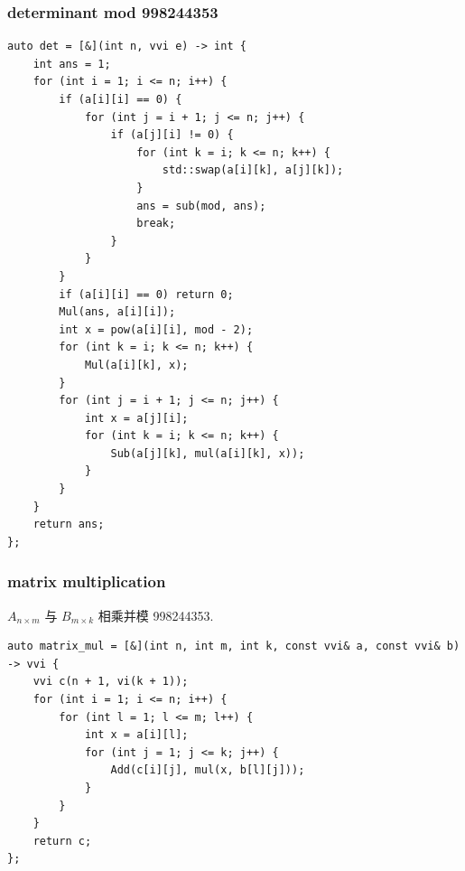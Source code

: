 \documentclass[UTF8, a4paper, titlepage, twoside]{ctexart}
\begin{document}
\subsubsection*{ determinant mod 998244353}
\begin{lstlisting}[style=cpp]
auto det = [&](int n, vvi e) -> int {
    int ans = 1;
    for (int i = 1; i <= n; i++) {
        if (a[i][i] == 0) {
            for (int j = i + 1; j <= n; j++) {
                if (a[j][i] != 0) {
                    for (int k = i; k <= n; k++) {
                        std::swap(a[i][k], a[j][k]);
                    }
                    ans = sub(mod, ans);
                    break;
                }
            }
        }
        if (a[i][i] == 0) return 0;
        Mul(ans, a[i][i]);
        int x = pow(a[i][i], mod - 2);
        for (int k = i; k <= n; k++) {
            Mul(a[i][k], x);
        }
        for (int j = i + 1; j <= n; j++) {
            int x = a[j][i];
            for (int k = i; k <= n; k++) {
                Sub(a[j][k], mul(a[i][k], x));
            }
        }
    }
    return ans;
};
\end{lstlisting}

\subsubsection*{ matrix multiplication }
\(A_{n \times m}\) 与 \(B_{m \times k}\) 相乘并模 998244353.
\begin{lstlisting}[style=cpp]
auto matrix_mul = [&](int n, int m, int k, const vvi& a, const vvi& b) -> vvi {
    vvi c(n + 1, vi(k + 1));
    for (int i = 1; i <= n; i++) {
        for (int l = 1; l <= m; l++) {
            int x = a[i][l];
            for (int j = 1; j <= k; j++) {
                Add(c[i][j], mul(x, b[l][j]));
            }
        }
    }
    return c;
};
\end{lstlisting}
\end{document}
